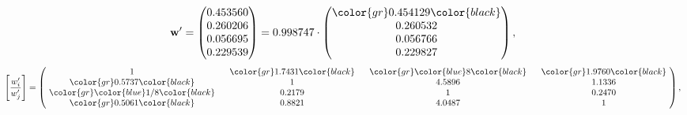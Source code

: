 \begin{example}
\begin{equation*}
\mathbf{w}^{\prime} =
\begin{pmatrix}
0.453560\\
0.260206\\
0.056695\\
0.229539
\end{pmatrix} =
0.998747\cdot
\begin{pmatrix}
\color{gr} 0.454129\color{black} \\
0.260532\\
0.056766\\
0.229827
\end{pmatrix},
\end{equation*}
\begin{equation*}
\left[ \frac{{w}^{\prime}_i}{{w}^{\prime}_j} \right] =
\begin{pmatrix}
$\,\,$ 1 $\,\,$ & $\,\,$\color{gr} 1.7431\color{black} $\,\,$ & $\,\,$\color{gr} \color{blue} 8\color{black} $\,\,$ & $\,\,$\color{gr} 1.9760\color{black} $\,\,$ \\
$\,\,$\color{gr} 0.5737\color{black} $\,\,$ & $\,\,$ 1 $\,\,$ & $\,\,$4.5896$\,\,$ & $\,\,$1.1336  $\,\,$ \\
$\,\,$\color{gr} \color{blue}  1/8\color{black} $\,\,$ & $\,\,$0.2179$\,\,$ & $\,\,$ 1 $\,\,$ & $\,\,$0.2470 $\,\,$ \\
$\,\,$\color{gr} 0.5061\color{black} $\,\,$ & $\,\,$0.8821$\,\,$ & $\,\,$4.0487$\,\,$ & $\,\,$ 1  $\,\,$ \\
\end{pmatrix},
\end{equation*}
\end{example}
\newpage

